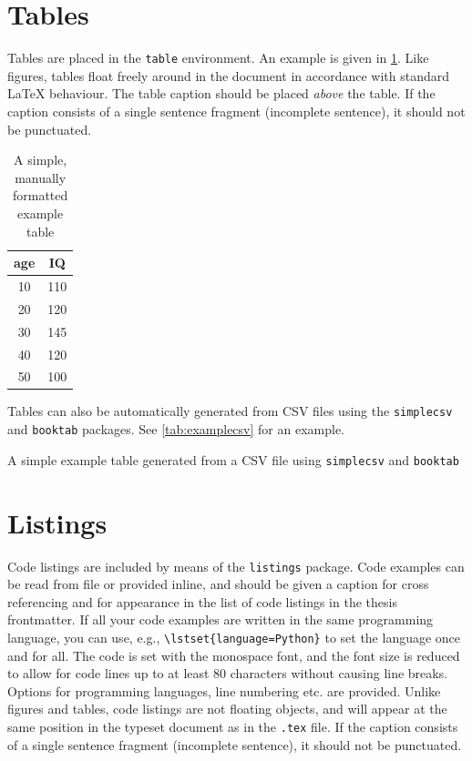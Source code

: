 \section{Tables}

Tables are placed in the \texttt{table} environment. An example is given in \cref{tab:example1}. Like figures, tables float freely around in the document in accordance with standard \LaTeX{} behaviour. The table caption should be placed \emph{above} the table. If the caption consists of a single sentence fragment (incomplete sentence), it should not be punctuated.

\begin{table}
  \centering
  \caption{A simple, manually formatted example table}
  \label{tab:example1}
  \begin{tabular}{cc}
    \hline
    age  & IQ \\ 
    \hline
    10   & 110 \\
    20   & 120 \\
    30   & 145 \\
    40   & 120 \\
    50   & 100 \\
    \hline
  \end{tabular}
\end{table}

Tables can also be automatically generated from CSV files using the \texttt{simplecsv} and \texttt{booktab} packages. See \cref{tab:examplecsv} for an example.

\begin{table}[tbp]
  \centering
  \caption[A simple example table generated from a CSV file]{A simple example table generated from a CSV file using \texttt{simplecsv} and \texttt{booktab}}
  \label{tab:examplecsv}
\end{table}

\section{Listings}

Code listings are included by means of the \texttt{listings} package. Code examples can be read from file or provided inline, and should be given a caption for cross referencing and for appearance in the list of code listings in the thesis frontmatter. If all your code examples are written in the same programming language, you can use, e.g., \texttt{\textbackslash lstset\{language=Python\}} to set the language once and for all. The code is set with the monospace font, and the font size is reduced to allow for code lines up to at least 80 characters without causing line breaks. Options for programming languages, line numbering etc. are provided. Unlike figures and tables, code listings are not floating objects, and will appear at the same position in the typeset document as in the \texttt{.tex} file. If the caption consists of a single sentence fragment (incomplete sentence), it should not be punctuated.

